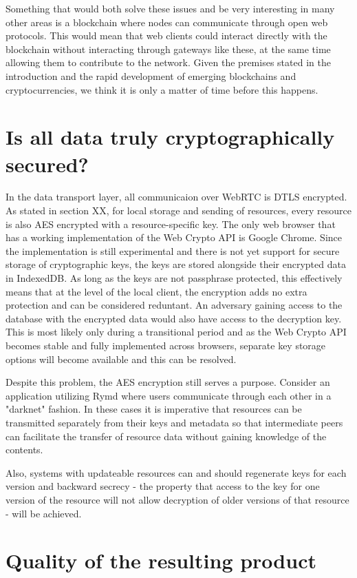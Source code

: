 Something that would both solve these issues and be very interesting in many other areas is a blockchain where nodes can communicate through open web protocols. This would mean that web clients could interact directly with the blockchain without interacting through gateways like these, at the same time allowing them to contribute to the network. Given the premises stated in the introduction and the rapid development of emerging blockchains and cryptocurrencies, we think it is only a matter of time before this happens.

\section{Is all data truly cryptographically secured?}
In the data transport layer, all communicaion over WebRTC is DTLS encrypted. As stated in section XX, for local storage and sending of resources, every resource is also AES encrypted with a resource-specific key. The only web browser that has a working implementation of the Web Crypto API is Google Chrome. Since the implementation is still experimental and there is not yet support for secure storage of cryptographic keys, the keys are stored alongside their encrypted data in IndexedDB. As long as the keys are not passphrase protected, this effectively means that at the level of the local client, the encryption adds no extra protection and can be considered reduntant. An adversary gaining access to the database with the encrypted data would also have access to the decryption key. This is most likely only during a transitional period and as the Web Crypto API becomes stable and fully implemented across browsers, separate key storage options will become available and this can be resolved.

Despite this problem, the AES encryption still serves a purpose. Consider an application utilizing Rymd where users communicate through each other in a "darknet" fashion. In these cases it is imperative that resources can be transmitted separately from their keys and metadata so that intermediate peers can facilitate the transfer of resource data without gaining knowledge of the contents.

Also, systems with updateable resources can and should regenerate keys for each version and backward secrecy - the property that access to the key for one version of the resource will not allow decryption of older versions of that resource - will be achieved.


\section{}

\section{Quality of the resulting product}


